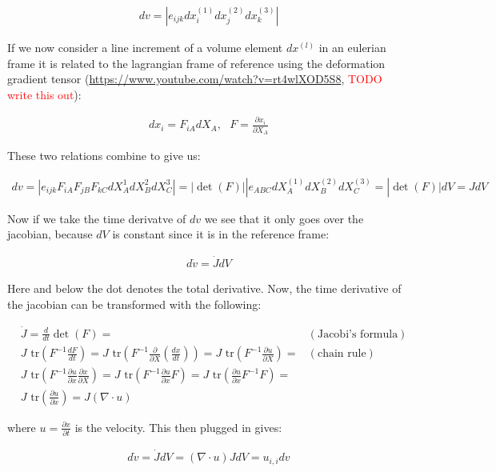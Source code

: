 \documentclass[a4paper,12pt]{article}
\newcommand{\pd}[2]{\frac{\partial #1}{\partial #2}}
\begin{document}
\begin{align*}
  dv = |e_{ijk} dx_i^{(1)}dx_j^{(2)}dx_k^{(3)}|
\end{align*}
  
If we now consider a line increment of a volume element $dx^{(l)}$ in an eulerian frame it is related to the lagrangian frame of reference using the deformation gradient tensor (\url{https://www.youtube.com/watch?v=rt4wlXOD5S8}, \textcolor{red}{TODO write this out}):

\begin{align}
  dx_i = F_{iA}dX_A, ~~~ F = \pd{x_i}{X_A}
\end{align}

These two relations combine to give us:

\begin{align}
  dv = |e_{ijk}F_{iA}F_{jB}F_{kC}dX^1_AdX^2_BdX^3_C| = |\det(F)||e_{ABC} dX_A^{(1)}dX_B^{(2)}dX_C^{(3)} = |\det(F)|dV = JdV
\end{align}

Now if we take the time derivatve of $dv$ we see that it only goes over the jacobian, because $dV$ is constant since it is in the reference frame:

\begin{align}
d\dot{v} = \dot{J} dV
\end{align}

Here and below the dot denotes the total derivative. Now, the time derivative of the jacobian can be transformed with the following:

\begin{align*}
  &\dot{J} = \frac{d}{dt} \det{(F)} = & (\text{Jacobi's formula})\\
  &J \text{ tr}\left(F^{-1}\frac{dF}{dt}\right)= J \text{ tr}\left(F^{-1}\pd{}{X}\left(\frac{dx}{dt}\right)\right)= J \text{ tr}\left(F^{-1}\pd{u}{X}\right) =  & (\text{chain rule})\\
  &J \text{ tr}\left(F^{-1}\pd{u}{x}\pd{x}{X}\right) = J \text{ tr}\left(F^{-1}\pd{u}{x}F\right) = J \text{ tr}\left(\pd{u}{x}F^{-1}F\right) = \\
  & J \text{ tr}\left(\pd{u}{x}\right) = J (\nabla \cdot u)
\end{align*}

where $u = \pd{x}{t}$ is the velocity. This then plugged in gives:

\begin{align}
  d\dot{v} = \dot{J}dV = (\nabla \cdot u) J dV = u_{i,i} dv
\end{align}
\end{document}
